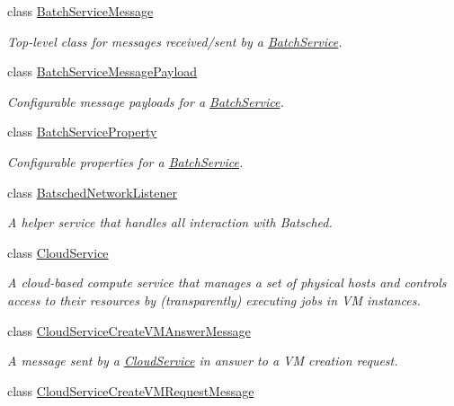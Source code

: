 \begin{DoxyCompactItemize}
class \hyperlink{classwrench_1_1_batch_service_message}{Batch\+Service\+Message}
\begin{DoxyCompactList}\small\item\em Top-\/level class for messages received/sent by a \hyperlink{classwrench_1_1_batch_service}{Batch\+Service}. \end{DoxyCompactList}\item 
class \hyperlink{classwrench_1_1_batch_service_message_payload}{Batch\+Service\+Message\+Payload}
\begin{DoxyCompactList}\small\item\em Configurable message payloads for a \hyperlink{classwrench_1_1_batch_service}{Batch\+Service}. \end{DoxyCompactList}\item 
class \hyperlink{classwrench_1_1_batch_service_property}{Batch\+Service\+Property}
\begin{DoxyCompactList}\small\item\em Configurable properties for a \hyperlink{classwrench_1_1_batch_service}{Batch\+Service}. \end{DoxyCompactList}\item 
class \hyperlink{classwrench_1_1_batsched_network_listener}{Batsched\+Network\+Listener}
\begin{DoxyCompactList}\small\item\em A helper service that handles all interaction with Batsched. \end{DoxyCompactList}\item 
class \hyperlink{classwrench_1_1_cloud_service}{Cloud\+Service}
\begin{DoxyCompactList}\small\item\em A cloud-\/based compute service that manages a set of physical hosts and controls access to their resources by (transparently) executing jobs in VM instances. \end{DoxyCompactList}\item 
class \hyperlink{classwrench_1_1_cloud_service_create_v_m_answer_message}{Cloud\+Service\+Create\+V\+M\+Answer\+Message}
\begin{DoxyCompactList}\small\item\em A message sent by a \hyperlink{classwrench_1_1_cloud_service}{Cloud\+Service} in answer to a VM creation request. \end{DoxyCompactList}\item 
class \hyperlink{classwrench_1_1_cloud_service_create_v_m_request_message}{Cloud\+Service\+Create\+V\+M\+Request\+Message}

\end{DoxyCompactItemize}
